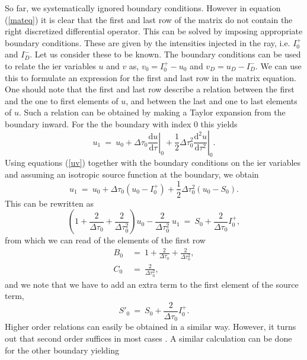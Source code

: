 \documentclass[]{article}
\newcommand{\D}{\text{d}}
\begin{document}
So far, we systematically ignored boundary conditions. However in equation (\ref{mateq}) it is clear that the first and last row of the matrix do not contain the right discretized differential operator. This can be solved by imposing appropriate boundary conditions. These are given by the intensities injected in the ray, i.e. $I_{0}^{+}$ and $I_{D}^{-}$. Let us consider these to be known. The boundary conditions can be used to relate the ier variables $u$ and $v$ as, $v_{0} = I_{0}^{+} - u_{0}$ and $v_{D} = u_{D} -I_{D}^{-}$. We can use this to formulate an expression for the first and last row in the matrix equation.
One should note that the first and last row describe a relation between the first and the one to first elements of $u$, and between the last and one to last elements of $u$. Such a relation can be obtained by making a Taylor expansion from the boundary inward. For the the boundary with index 0 this yields
\begin{equation}
u_{1} \ = \ u_{0} + \Delta\tau_{0} \left.\frac{\D u}{\D \tau}\right|_{0} + \frac{1}{2} \Delta\tau_{0}^{2} \left.\frac{\D^{2} u}{\D \tau^{2}}\right|_{0} .
\end{equation}
Using equations (\ref{uv}) together with the boundary conditions on the ier variables and assuming an isotropic source function at the boundary, we obtain
\begin{equation}
u_{1} \ = \ u_{0} + \Delta\tau_{0} \left(u_{0}-I_{0}^{+}\right) + \frac{1}{2} \Delta\tau_{0}^{2} \left( u_{0} - S_{0} \right) .
\end{equation}
This can be rewritten as
\begin{equation}
\left( 1 + \frac{2}{\Delta\tau_{0}} + \frac{2}{\Delta\tau_{0}^{2}} \right)u_{0} - \frac{2}{\Delta\tau_{0}^{2}} \ u_{1}
  \ = \  S_{0} + \frac{2}{\Delta\tau_{0}} I_{0}^{+},
\end{equation}
from which we can read of the elements of the first row
\begin{equation}
\begin{split}
B_{0} \ &= \ 1 + \frac{2}{\Delta\tau_{0}} + \frac{2}{\Delta\tau_{0}^{2}}, \\
C_{0} \ &= \ \frac{2}{\Delta\tau_{0}^{2}},
\end{split}
\end{equation}
and we note that we have to add an extra term to the first element of the source term,
\begin{equation}
S'_{0}  \ = \  S_{0} + \frac{2}{\Delta\tau_{0}} I_{0}^{+}.
\end{equation}
Higher order relations can easily be obtained in a similar way. However, it turns out that second order suffices in most cases \cite{MihalasMihalas}. A similar calculation can be done for the other boundary yielding
\end{document}
